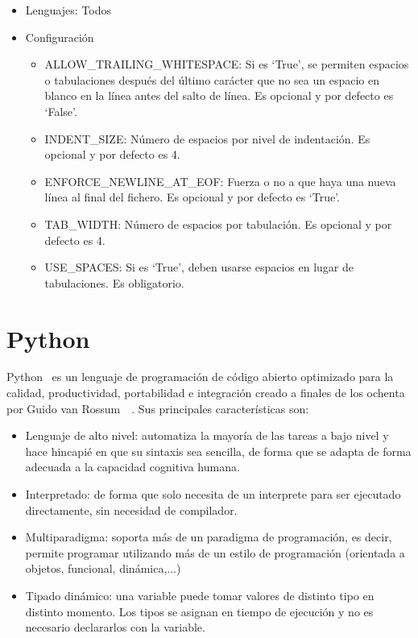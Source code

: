 \documentclass[a4paper, 12pt]{book}
\begin{document}
\begin{itemize}
  \item Lenguajes: Todos
  \item Configuración
    \begin{itemize}
          \item ALLOW\_TRAILING\_WHITESPACE: Si es `True', se permiten espacios o tabulaciones después del último carácter que no sea un espacio en blanco en la línea antes del salto de línea. Es opcional y por defecto es `False'.
          \item INDENT\_SIZE: Número de espacios por nivel de indentación. Es opcional y por defecto es 4.
          \item ENFORCE\_NEWLINE\_AT\_EOF: Fuerza o no a que haya una nueva línea al final del fichero. Es opcional y por defecto es `True'.
          \item TAB\_WIDTH: Número de espacios por tabulación. Es opcional y por defecto es 4.
          \item USE\_SPACES: Si es `True', deben usarse espacios en lugar de tabulaciones. Es obligatorio.
    \end{itemize}
\end{itemize}

\section{Python} 
\label{sec:seccion2}
Python~\cite{python:_python} es un lenguaje de programación de código abierto optimizado para la calidad, productividad, portabilidad e integración creado a finales de los ochenta por Guido van Rossum~\cite{lutz:_programming_python}~\cite{beazley:_essential_reference}. Sus principales características son:

\begin{itemize}
  \item Lenguaje de alto nivel: automatiza la mayoría de las tareas a bajo nivel y hace hincapié en que su sintaxis sea sencilla, de forma que se adapta de forma adecuada a la capacidad cognitiva humana.
  \item Interpretado: de forma que solo necesita de un interprete para ser ejecutado directamente, sin necesidad de compilador.
  \item Multiparadigma: soporta más de un paradigma de programación, es decir, permite programar utilizando más de un estilo de programación (orientada a objetos, funcional, dinámica,...)
  \item Tipado dinámico: una variable puede tomar valores de distinto tipo en distinto momento. Los tipos se asignan en tiempo de ejecución y no es necesario declararlos con la variable.
\end{itemize}
\end{document}
